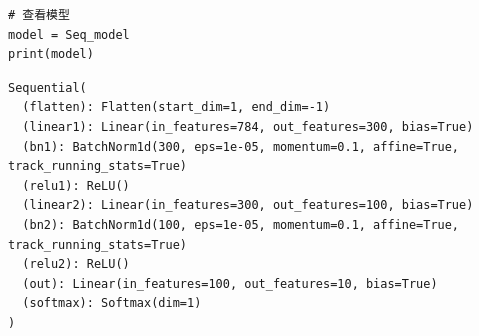 \begin{enumerate}[label=\arabic*)]
\begin{lstlisting}[style=pythonstyle]
# 查看模型
model = Seq_model
print(model)    
\end{lstlisting}
\begin{lstlisting}[style=demostyle,numbers=none]
Sequential(
  (flatten): Flatten(start_dim=1, end_dim=-1)
  (linear1): Linear(in_features=784, out_features=300, bias=True)
  (bn1): BatchNorm1d(300, eps=1e-05, momentum=0.1, affine=True, track_running_stats=True)
  (relu1): ReLU()
  (linear2): Linear(in_features=300, out_features=100, bias=True)
  (bn2): BatchNorm1d(100, eps=1e-05, momentum=0.1, affine=True, track_running_stats=True)
  (relu2): ReLU()
  (out): Linear(in_features=100, out_features=10, bias=True)
  (softmax): Softmax(dim=1)
)
\end{lstlisting}    


\end{enumerate}

